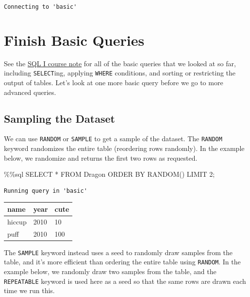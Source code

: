 \documentclass[
  letterpaper,
  DIV=11,
  numbers=noendperiod]{scrreprt}
\newenvironment{Shaded}{\begin{snugshade}}{\end{snugshade}}
\newcommand{\DecValTok}[1]{\textcolor[rgb]{0.68,0.00,0.00}{#1}}
\newcommand{\NormalTok}[1]{\textcolor[rgb]{0.00,0.23,0.31}{#1}}
\newcommand{\OperatorTok}[1]{\textcolor[rgb]{0.37,0.37,0.37}{#1}}
\begin{document}
\begin{verbatim}
Connecting to 'basic'
\end{verbatim}

\section{Finish Basic Queries}\label{finish-basic-queries}

See the \href{https://ds100.org/course-notes/sql_I/sql_I.html}{SQL I
course note} for all of the basic queries that we looked at so far,
including \texttt{SELECT}ing, applying \texttt{WHERE} conditions, and
sorting or restricting the output of tables. Let's look at one more
basic query before we go to more advanced queries.

\subsection{Sampling the Dataset}\label{sampling-the-dataset}

We can use \texttt{RANDOM} or \texttt{SAMPLE} to get a sample of the
dataset. The \texttt{RANDOM} keyword randomizes the entire table
(reordering rows randomly). In the example below, we randomize and
returns the first two rows as requested.

\begin{Shaded}
\begin{Highlighting}[]
\OperatorTok{\%\%}\NormalTok{sql}
\NormalTok{SELECT }\OperatorTok{*} 
\NormalTok{FROM Dragon}
\NormalTok{ORDER BY RANDOM()}
\NormalTok{LIMIT }\DecValTok{2}\OperatorTok{;}
\end{Highlighting}
\end{Shaded}

\begin{verbatim}
Running query in 'basic'
\end{verbatim}

\begin{longtable}[]{@{}lll@{}}
\toprule\noalign{}
name & year & cute \\
\midrule\noalign{}
\endhead
\bottomrule\noalign{}
\endlastfoot
hiccup & 2010 & 10 \\
puff & 2010 & 100 \\
\end{longtable}

The \texttt{SAMPLE} keyword instead uses a seed to randomly draw samples
from the table, and it's more efficient than ordering the entire table
using \texttt{RANDOM}. In the example below, we randomly draw two
samples from the table, and the \texttt{REPEATABLE} keyword is used here
as a seed so that the same rows are drawn each time we run this.
\end{document}
